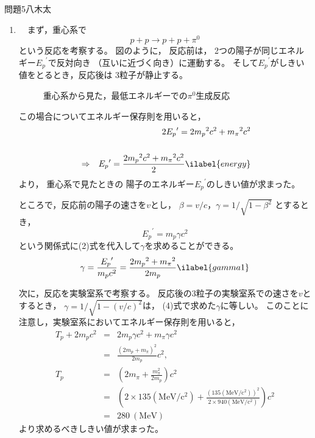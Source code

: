 \documentclass[fleqn]{jbook}
\newcommand{\no}{\nonumber \\}
\newcommand{\R}[1]{(\mathrm{#1})}
\begin{document}
\begin{answer}{問題5}{八木太}
\setcounter{equation}{0}

\begin{enumerate}

  \item 　まず，重心系で
\begin{equation}
p+p \to p+p+\pi^0
\end{equation}
という反応を考察する。
図のように，
反応前は，
2つの陽子が同じエネルギー${E_p}^\prime$で反対向き
（互いに近づく向き）に運動する。
そして${E_p}^\prime$がしきい値をとるとき，反応後は
3粒子が静止する。

\begin{figure}[htbp]
    \centering
    
    \vspace{3mm}
    \caption{重心系から見た，最低エネルギーでの$\pi^0$生成反応}
\end{figure}

この場合についてエネルギー保存則を用いると，
\begin{eqnarray}
&&2{E_p}^\prime = 2{m_p}^2 c^2 + {m_{\pi}}^2 c^2 \no
& & \cr
&\Rightarrow & {E_p}^\prime = \frac{2{m_p}^2 c^2 + {m_{\pi}}^2 c^2}{2}
\ilabel{energy}
\end{eqnarray}
より，
重心系で見たときの
陽子のエネルギー${E_p}^\prime$のしきい値が求まった。

ところで，反応前の陽子の速さを$v$とし，
$\beta=v/c$，$\gamma=1/\sqrt{1-\beta^2}$
とするとき，
\begin{equation}
{E_p}^\prime = m_p \gamma c^2
\end{equation}
という関係式に(2)式を代入して$\gamma$を求めることができる。
\begin{equation}
\gamma = \frac{{E_p}^\prime}{m_p c^2}
    = \frac{2{m_p}^2 + {m_{\pi}}^2}{2m_p}
\ilabel{gamma1}
\end{equation}

次に，反応を実験室系で考察する。
反応後の3粒子の実験室系での速さを$v$とするとき，
$\gamma=1/\sqrt{1-(v/c)^2}$は，
(4)式で求めた$\gamma$に等しい。
このことに注意し，実験室系においてエネルギー保存則を用いると，
\begin{eqnarray}
T_p + 2 m_p c^2 
  &=& 2 m_p \gamma c^2 + m_{\pi} \gamma c^2 \no
  &=& \frac{(2 m_p + m_{\pi})^2}{2 m_p} c^2 ,\no
T_p
  &=& \left( 2m_{\pi} + \frac{m_{\pi}^2}{2m_p} \right) c^2 \no
  &=& \left( 2 \times 135\R{MeV/c^2} 
        + \frac{(135\R{MeV/c^2})^2}{2 \times 940\R{MeV/c^2}} \right) c^2 \no
  &=& 280~\R{MeV}
\end{eqnarray}
より求めるべきしきい値が求まった。\\
  

\end{enumerate}
\end{answer}
\end{document}
